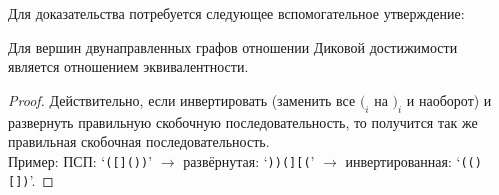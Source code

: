 Для доказательства потребуется следующее вспомогательное утверждение:

\begin{lemma}\label{lemma:bidir_equiv}
  Для вершин двунаправленных графов отношении Диковой достижимости является отношением эквивалентности.
\end{lemma}
\begin{proof}

  Действительно, если инвертировать (заменить все $(_i$ на $)_i$ и наоборот) и развернуть правильную скобочную последовательность, то получится так же правильная скобочная последовательность.\\
  Пример: ПСП: `\texttt{([]())}' $\to$ развёрнутая: `\texttt{))(][(}' $\to$ инвертированная: `\texttt{(()[])}'.

\end{proof}

